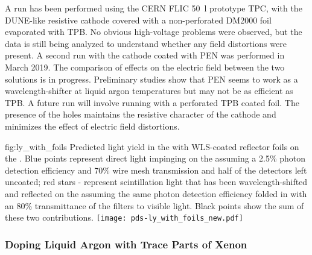 A run has been performed using the CERN FLIC \SI{50}{l} prototype TPC, with
the DUNE-like resistive cathode covered with a non-perforated DM2000
foil evaporated with TPB. No obvious high-voltage problems were observed, but 
the data is still being analyzed to understand whether any field
distortions were present.  A second run with the cathode coated with PEN
was performed in March 2019. The comparison of effects on the electric field between the two solutions is in progress. Preliminary studies show that PEN seems to work as a wavelength-shifter at liquid argon temperatures but may not be as efficient as TPB. A future run will involve running with a perforated TPB coated foil. The presence of the holes maintains the resistive character of the cathode and minimizes the effect of electric field distortions. 


\begin{dunefigure}{fig:ly_with_foils}
{Predicted light yield in the  with WLS-coated reflector foils on the . Blue points represent direct  light impinging on the  assuming a 2.5\% photon detection efficiency and 70\% wire mesh transmission and half of the detectors left uncoated; red stars - represent scintillation light that has been wavelength-shifted and reflected on the  assuming the same photon detection efficiency folded in with an 80\% transmittance of the filters to visible light. Black points show the sum of these two contributions.}
\texttt{[image: pds-ly\_with\_foils\_new.pdf]}
\end{dunefigure}

\subsubsection{Doping Liquid Argon with Trace Parts of Xenon}
\label{sec:fdsp-pd-enh-xenon}


